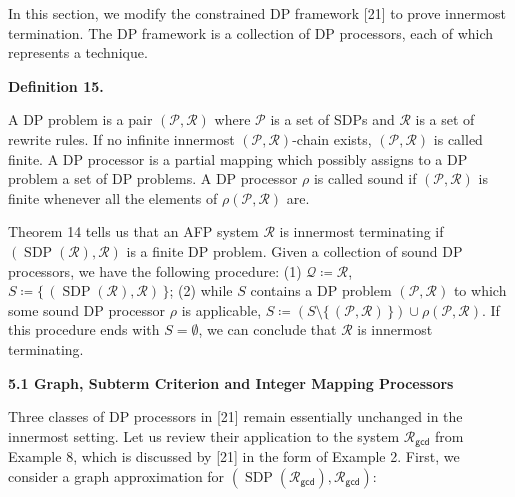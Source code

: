 \documentclass[10pt,a4paper]{amsart}
\providecommand{\coloneq}{\coloneqq}
\begin{document}
 
In this section, we modify the constrained DP framework [21] to prove innermost termination. The DP framework is a collection of DP processors, each of which represents a technique.\par
 
 
 
\par\medskip\noindent\textbf{Definition 15.}\par
 
 
A DP problem is a pair $(\mathcal{P},\mathcal{R})$ where $\mathcal{P}$ is a set of SDPs and $\mathcal{R}$ is a set of rewrite rules. If no infinite innermost $(\mathcal{P},\mathcal{R})$-chain exists, $(\mathcal{P},\mathcal{R})$ is called finite. A DP processor is a partial mapping which possibly assigns to a DP problem a set of DP problems. A DP processor $\rho$ is called sound if $(\mathcal{P},\mathcal{R})$ is finite whenever all the elements of $\rho(\mathcal{P},\mathcal{R})$ are.\par
 
 
 
 
Theorem 14 tells us that an AFP system $\mathcal{R}$ is innermost terminating if $(\operatorname{SDP}(\mathcal{R}),\mathcal{R})$ is a finite DP problem. Given a collection of sound DP processors, we have the following procedure: (1) $\mathcal{Q}\coloneq\mathcal{R}$, $S\coloneq\{\,(\operatorname{SDP}(\mathcal{R}),\mathcal{R})\,\}$; (2) while $S$ contains a DP problem $(\mathcal{P},\mathcal{R})$ to which some sound DP processor $\rho$ is applicable, $S\coloneq(S\setminus\{\,(\mathcal{P},\mathcal{R})\,\})\cup\rho(\mathcal{P},\mathcal{R})$. If this procedure ends with $S=\emptyset$, we can conclude that $\mathcal{R}$ is innermost terminating.\par
 
 
 
\par\medskip\noindent\textbf{5.1 Graph, Subterm Criterion and Integer Mapping Processors}\par
 
 
Three classes of DP processors in [21] remain essentially unchanged in the innermost setting. Let us review their application to the system $\mathcal{R}_{\mathsf{gcd}}$ from Example 8, which is discussed by [21] in the form of Example 2. First, we consider a graph approximation for $(\operatorname{SDP}(\mathcal{R}_{\mathsf{gcd}}),\mathcal{R}_{\mathsf{gcd}})$:\par
 
\end{document}
